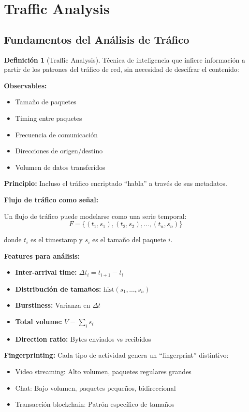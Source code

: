 \documentclass[11pt,a4paper,twoside]{book}
\theoremstyle{definition}
\newtheorem{definition}{Definición}[chapter]
\theoremstyle{remark}
\begin{document}
\section{Traffic Analysis}
\label{sec:traffic-analysis}

\subsection{Fundamentos del Análisis de Tráfico}

\begin{definition}[Traffic Analysis]
Técnica de inteligencia que infiere información a partir de los patrones del tráfico de red, sin necesidad de descifrar el contenido:

\textbf{Observables:}
\begin{itemize}
    \item Tamaño de paquetes
    \item Timing entre paquetes
    \item Frecuencia de comunicación
    \item Direcciones de origen/destino
    \item Volumen de datos transferidos
\end{itemize}

\textbf{Principio:} Incluso el tráfico encriptado ``habla'' a través de sus metadatos.
\end{definition}

\begin{mathnote}
\textbf{Flujo de tráfico como señal:}

Un flujo de tráfico puede modelarse como una serie temporal:
\[
F = \{(t_1, s_1), (t_2, s_2), ..., (t_n, s_n)\}
\]

donde $t_i$ es el timestamp y $s_i$ es el tamaño del paquete $i$.

\textbf{Features para análisis:}
\begin{itemize}
    \item \textbf{Inter-arrival time:} $\Delta t_i = t_{i+1} - t_i$
    \item \textbf{Distribución de tamaños:} $\text{hist}(s_1, ..., s_n)$
    \item \textbf{Burstiness:} Varianza en $\Delta t$
    \item \textbf{Total volume:} $V = \sum_{i} s_i$
    \item \textbf{Direction ratio:} Bytes enviados vs recibidos
\end{itemize}

\textbf{Fingerprinting:} Cada tipo de actividad genera un ``fingerprint'' distintivo:
\begin{itemize}
    \item Video streaming: Alto volumen, paquetes regulares grandes
    \item Chat: Bajo volumen, paquetes pequeños, bidireccional
    \item Transacción blockchain: Patrón específico de tamaños
\end{itemize}
\end{mathnote}
\end{document}
